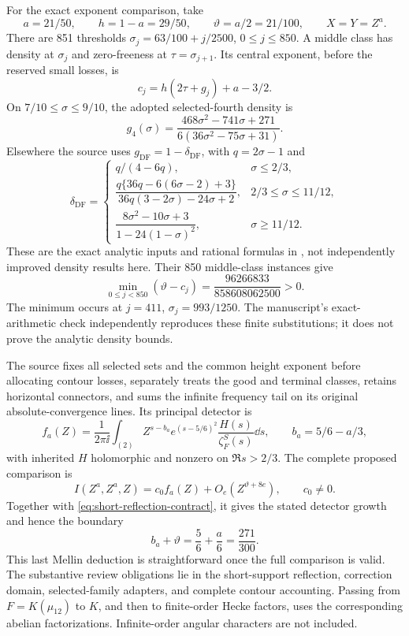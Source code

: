 For the exact exponent comparison, take
\[
 a=21/50,\qquad h=1-a=29/50,\qquad \vartheta=a/2=21/100,
 \qquad X=Y=Z^a.
\]
There are 851 thresholds $\sigma_j=63/100+j/2500$, $0\le j\le850$. A middle class has density at $\sigma_j$ and zero-freeness at $\tau=\sigma_{j+1}$. Its central exponent, before the reserved small losses, is
\begin{equation}\label{eq:middle-exponent}
 c_j=h(2\tau+g_j)+a-3/2.
\end{equation}
On $7/10\le\sigma\le9/10$, the adopted selected-fourth density is
\[
 g_4(\sigma)=\frac{468\sigma^2-741\sigma+271}
                  {6(36\sigma^2-75\sigma+31)}.
\]
Elsewhere the source uses $g_{\mathrm{DF}}=1-\delta_{\mathrm{DF}}$, with $q=2\sigma-1$ and
\[
 \delta_{\mathrm{DF}}=\begin{cases}
 q/(4-6q),&\sigma\le2/3,\\
 \dfrac{q\{36q-6(6\sigma-2)+3\}}
 {36q(3-2\sigma)-24\sigma+2},&2/3\le\sigma\le11/12,\\[3pt]
 \dfrac{8\sigma^2-10\sigma+3}{1-24(1-\sigma)^2},&\sigma\ge11/12.
 \end{cases}
\]
These are the exact analytic inputs and rational formulas in \cite[\texttt{DENSITY.md}]{R977}, not independently improved density results here. Their 850 middle-class instances give
\begin{equation}\label{eq:271-margin}
 \min_{0\le j<850}(\vartheta-c_j)
     =\frac{96266833}{858608062500}>0.
\end{equation}
The minimum occurs at $j=411$, $\sigma_j=993/1250$. The manuscript's exact-arithmetic check independently reproduces these finite substitutions; it does not prove the analytic density bounds.

The source fixes all selected sets and the common height exponent before allocating contour losses, separately treats the good and terminal classes, retains horizontal connectors, and sums the infinite frequency tail on its original absolute-convergence lines. Its principal detector is
\[
 f_a(Z)=\frac1{2\pi\ii}\int_{(2)}
 Z^{s-b_a}e^{(s-5/6)^2}\frac{H(s)}{\zeta_F^S(s)}\dd s,
 \qquad b_a=5/6-a/3,
\]
with inherited $H$ holomorphic and nonzero on $\Re s>2/3$. The complete proposed comparison is
\[
 I(Z^a,Z^a,Z)=c_0f_a(Z)+O_e(Z^{\vartheta+8e}),\qquad c_0\ne0.
\]
Together with \eqref{eq:short-reflection-contract}, it gives the stated detector growth and hence the boundary
\[
 b_a+\vartheta=\frac56+\frac a6=\frac{271}{300}.
\]
This last Mellin deduction is straightforward once the full comparison is valid. The substantive review obligations lie in the short-support reflection, correction domain, selected-family adapters, and complete contour accounting. Passing from $F=K(\mu_{12})$ to $K$, and then to finite-order Hecke factors, uses the corresponding abelian factorizations. Infinite-order angular characters are not included.


